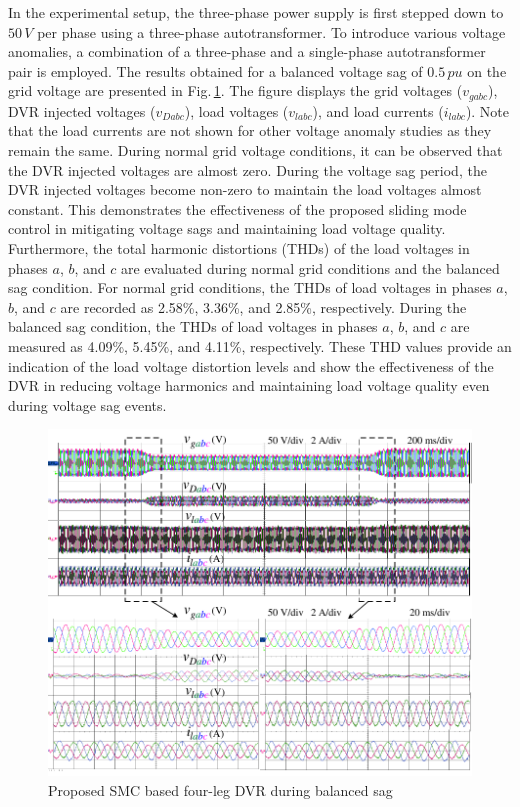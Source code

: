 In the experimental setup, the three-phase power supply is first stepped down to $50\,\si{V}$ per phase using a three-phase autotransformer. To introduce various voltage anomalies, a combination of a three-phase and a single-phase autotransformer pair is employed. The results obtained for a balanced voltage sag of $0.5\,\si{pu}$ on the grid voltage are presented in Fig.\,\ref{5.BalSag}. The figure displays the grid voltages ($v_{gabc}$), DVR injected voltages ($v_{Dabc}$), load voltages ($v_{labc}$), and load currents ($i_{labc}$). Note that the load currents are not shown for other voltage anomaly studies as they remain the same. 
During normal grid voltage conditions, it can be observed that the DVR injected voltages are almost zero. During the voltage sag period, the DVR injected voltages become non-zero to maintain the load voltages almost constant. This demonstrates the effectiveness of the proposed sliding mode control in mitigating voltage sags and maintaining load voltage quality. 
Furthermore, the total harmonic distortions (THDs) of the load voltages in phases $a$, $b$, and $c$ are evaluated during normal grid conditions and the balanced sag condition. For normal grid conditions, the THDs of load voltages in phases $a$, $b$, and $c$ are recorded as 2.58\%, 3.36\%, and 2.85\%, respectively. During the balanced sag condition, the THDs of load voltages in phases $a$, $b$, and $c$ are measured as 4.09\%, 5.45\%, and 4.11\%, respectively. These THD values provide an indication of the load voltage distortion levels and show the effectiveness of the DVR in reducing voltage harmonics and maintaining load voltage quality even during voltage sag events.
\begin{figure}[t!] %
	\centering
	\includegraphics[scale=1]{figures/Chapter_5/Mine/BalancedSag}
	\caption{Proposed SMC based four-leg DVR during balanced sag}  
	\label{5.BalSag}
\end{figure}

